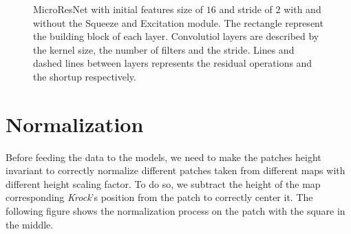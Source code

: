 \documentclass[../document.tex]{subfiles}
\begin{document}
\begin{figure}[htbp]
    \caption{MicroResNet with initial features size of $16$ and stride of $2$ with and without the Squeeze and Excitation module. The rectangle represent the building block of each layer. Convolutiol layers are described by the kernel size, the number of filters and the stride. Lines and dashed lines between layers represents the residual operations and the shortup respectively.}
    \label{fig : microresnet}
\end{figure}

\section{Normalization}
Before feeding the data to the models, we need to make the patches height invariant to correctly normalize different patches taken from different maps with different height scaling factor. To do so, we subtract the height of the map corresponding \emph{Krock}'s position from the patch to correctly center it. The following figure shows the normalization process on the patch with the square in the middle.
\end{document}
